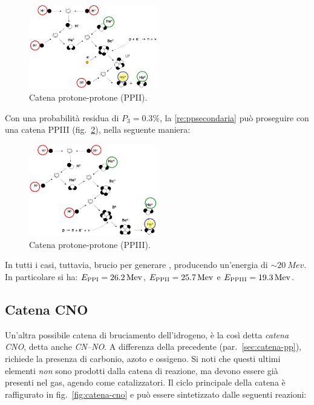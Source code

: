 \begin{figure}
    \centering
    \includegraphics[width=0.5\textwidth]{immagini/catena-pp2.png}
    \caption{Catena protone-protone (PPII).}
    \label{fig:catena-pp2}
\end{figure}

Con una probabilità residua di $P_3 = 0.3\%$, la \ref{re:ppsecondaria} può proseguire con una catena PPIII (fig.~\ref{fig:catena-pp3}), nella seguente maniera:

\begin{figure}
    \centering
    \includegraphics[width=0.5\textwidth]{immagini/catena-pp3.png}
    \caption{Catena protone-protone (PPIII).}
    \label{fig:catena-pp3}
\end{figure}

In tutti i casi, tuttavia, brucio  per generare , producendo un'energia di $\sim \SI{20}{Mev}$. In particolare si ha: $E_\textup{PPI} = \SI{26.2}{Mev}$, $E_\textup{PPII} = \SI{25.7}{Mev}$ e $E_\textup{PPIII} = \SI{19.3}{Mev}$. 

\subsection{Catena CNO}\label{sec:catena-cno}
Un'altra possibile catena di bruciamento dell'idrogeno, è la così detta \emph{catena CNO}, detta anche \emph{CN--NO}. A differenza della precedente (par.~\ref{sec:catena-pp}), richiede la presenza di carbonio, azoto e ossigeno. Si noti che questi ultimi elementi \emph{non} sono prodotti dalla catena di reazione, ma devono essere già presenti nel gas, agendo come catalizzatori. Il ciclo principale della catena è raffigurato in fig.~\ref{fig:catena-cno} e può essere sintetizzato dalle seguenti reazioni:

